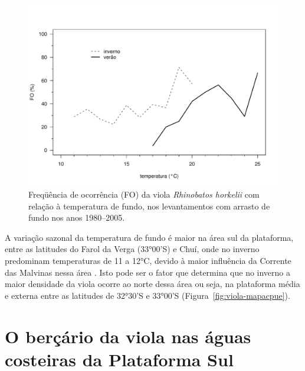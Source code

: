 \documentclass[a4paper,11pt,twoside,showtrims,onecolumn,openright,final]{memoir}
\begin{document}
%
%

\begin{figure}
\begin{center}
\includegraphics[width=\textwidth]{VIOLA_DISTRIBTEMPFUNDO}
\end{center}
\caption[Freqüência de ocorrência (FO) da viola \emph{Rhinobatos horkelii} 
	 com relação à temperatura de fundo]
	{Freqüência de ocorrência (FO) da viola \emph{Rhinobatos horkelii} 
	 com relação à temperatura de fundo, nos levantamentos com 
	 arrasto de fundo nos anos 1980--2005.}
\label{fig:viola-distrib-tempfundo}
\end{figure}


A variação sazonal da temperatura de fundo é maior  na área sul da plataforma, 
entre as latitudes do Farol da Verga (33°00'S) e Chuí, onde no inverno predominam 
temperaturas de 11 a 12°C, devido à maior influência da Corrente das Malvinas nessa área \citep{HAIMOVICI1994B}. %
Isto pode ser o fator que determina que no inverno a maior densidade da viola
ocorre ao norte dessa área ou seja, na plataforma média e externa entre as 
latitudes de 32°30'S e 33°00'S (Figura~\ref{fig:viola-mapacpue}). 

\section*{O berçário da viola nas águas costeiras da Plataforma Sul}
\end{document}
